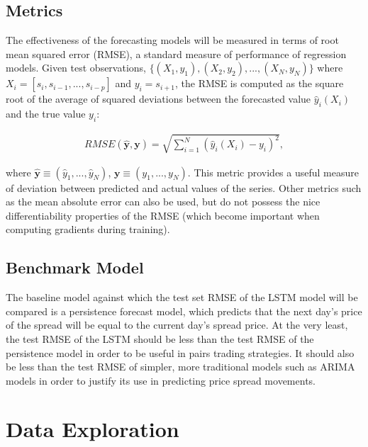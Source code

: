 \documentclass{article}
\begin{document}
\subsection{Metrics}

The effectiveness of the forecasting models will be measured in terms of root mean squared error (RMSE), a standard measure of performance of regression models. Given test observations, 
$\{(X_{1}, y_{1}), (X_{2}, y_{2}), ...,  (X_{N}, y_{N}) \}$ where $X_{i} = [s_{i}, s_{i-1}, ..., s_{i-p}]$ and $y_{i} = s_{i+1}$,
the RMSE is computed as the square root of the average of squared deviations between the forecasted value $\hat{y}_{i}(X_{i})$ and the true value $y_{i}$:

\begin{align}
RMSE(\boldsymbol{\hat{y}}, \boldsymbol{y}) = \sqrt{\sum_{i=1}^{N} \left(\hat{y}_{i}(X_{i}) - y_{i}\right)^{2} },
\end{align}

\noindent where $\boldsymbol{\hat{y}} \equiv (\hat{y}_{1}, ... , \hat{y}_{N})$, $\boldsymbol{y} \equiv (y_{1}, ... , y_{N})$. This metric provides a useful measure of deviation between predicted and actual values of the series. Other metrics such as the mean absolute error can also be used, but do not possess the nice differentiability properties of the RMSE (which become important when computing gradients during training). 

\subsection{Benchmark Model}

 The baseline model against which the test set RMSE of the LSTM model will be compared is a persistence forecast model, which predicts that the next day's price of the spread will be equal to the current day's spread price. At the very least, the test RMSE of the LSTM should be less than the test RMSE of the persistence model in order to be useful in pairs trading strategies. It should also be less than the test RMSE of simpler, more traditional models such as ARIMA models in order to justify its use in predicting price spread movements.  
 
 



\section{Data Exploration}
\end{document}
